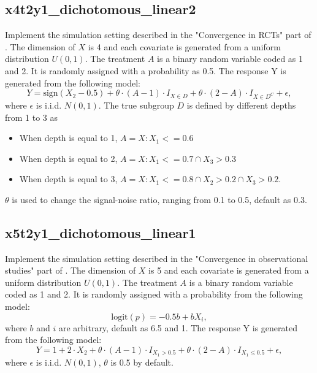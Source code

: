 \documentclass[12pt]{article}
\begin{document}
\subsection*{x4t2y1\_dichotomous\_linear2}
Implement the simulation setting described in the "Convergence in RCTs" part of \cite{fu2016estimating}. The dimension of $X$ is 4 and each covariate is generated from a uniform distribution $U(0,1)$. The treatment $A$ is a binary random variable coded as 1 and 2. It is randomly assigned with a probability as 0.5. The response Y is generated from the following model:
\begin{equation*}
Y=\text{sign}(X_2-0.5)+\theta\cdot (A-1) \cdot I_{X\in D} + \theta \cdot(2-A) \cdot I_{X\in D^C}+\epsilon,
\end{equation*}
where $\epsilon$ is i.i.d. $N(0,1)$. The true subgroup $D$ is defined by different depths from 1 to 3 as
\begin{itemize}
	\item When depth is equal to 1, $A={X:X_1<=0.6}$
	\item When depth is equal to 2, $A={X:X_1<=0.7 \cap X_3>0.3}$
	\item When depth is equal to 3, $A={X:X_1<=0.8 \cap X_2>0.2 \cap X_3>0.2}$.
\end{itemize}
$\theta$ is used to change the signal-noise ratio, ranging from 0.1 to 0.5, default as 0.3.

\subsection*{x5t2y1\_dichotomous\_linear1}
Implement the simulation setting described in the "Convergence in observational studies" part of \cite{fu2016estimating}. The dimension of $X$ is 5 and each covariate is generated from a uniform distribution $U(0,1)$. The treatment $A$ is a binary random variable coded as 1 and 2. It is randomly assigned with a probability from the following model:
\begin{equation*}
\text{logit}(p)=-0.5b+bX_i,
\end{equation*} 
where $b$ and $i$ are arbitrary, default as 6.5 and 1. The response Y is generated from the following model:
\begin{equation*}
Y=1+2\cdot X_2+\theta \cdot (A-1)\cdot I_{X_1>0.5}+\theta \cdot (2-A)\cdot I_{X_1\le 0.5}+\epsilon,
\end{equation*}
where $\epsilon$ is i.i.d. $N(0,1)$, $\theta$ is 0.5 by default.
\end{document}
